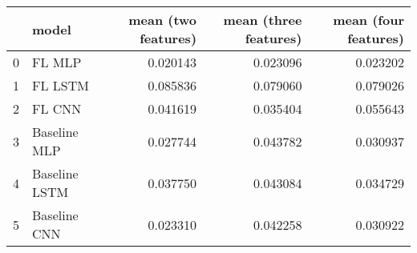 \begin{tabular}{llrrr}
\toprule
{} &          model &  mean (two features) &  mean (three features) &  mean (four features) \\
\midrule
0 &         FL MLP &             0.020143 &               0.023096 &              0.023202 \\
1 &        FL LSTM &             0.085836 &               0.079060 &              0.079026 \\
2 &         FL CNN &             0.041619 &               0.035404 &              0.055643 \\
3 &   Baseline MLP &             0.027744 &               0.043782 &              0.030937 \\
4 &  Baseline LSTM &             0.037750 &               0.043084 &              0.034729 \\
5 &   Baseline CNN &             0.023310 &               0.042258 &              0.030922 \\
\bottomrule
\end{tabular}
